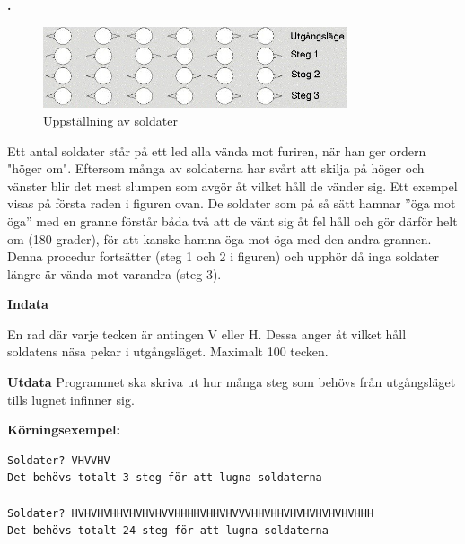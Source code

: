 \documentclass[a4paper,12pt]{article}
\newcounter{iii}\setcounter{iii}{0}
\def\i{\bigskip\noindent\refstepcounter{iii}\textbf{\arabic{iii}.} }
\begin{document}
\pagebreak

\i

\begin{figure}[!ht]
\centering
\includegraphics[width=0.8\textwidth]{soldater.jpg}
\caption{Uppställning av soldater}
\label{fig:soldater}
\end{figure}

Ett antal soldater står på ett led alla vända mot furiren, när han ger ordern "höger om". Eftersom många av soldaterna har svårt att skilja på höger och vänster blir det mest slumpen som avgör åt vilket håll de vänder sig. Ett exempel visas på första raden i figuren ovan. De soldater som på så sätt hamnar ''öga mot öga'' med en granne förstår båda två att de vänt sig åt fel håll och gör därför helt om (180 grader), för att kanske hamna öga mot öga med den andra grannen. Denna procedur fortsätter (steg 1 och 2 i figuren) och upphör då inga soldater längre är vända mot varandra (steg 3).

\textbf{Indata}

En rad där varje tecken är antingen V eller H. Dessa anger åt vilket håll soldatens näsa pekar i utgångsläget. Maximalt 100 tecken. 

\textbf{Utdata}
Programmet ska skriva ut hur många steg som behövs från utgångsläget tills lugnet infinner sig.

\textbf{Körningsexempel:}
\begin{lstlisting}
Soldater? VHVVHV
Det behövs totalt 3 steg för att lugna soldaterna

Soldater? HVHVHVHHVHVHVHVVHHHHVHHVHVVVHHVHHVHVHVHVHVHVHHH
Det behövs totalt 24 steg för att lugna soldaterna
\end{lstlisting}

\end{document}
